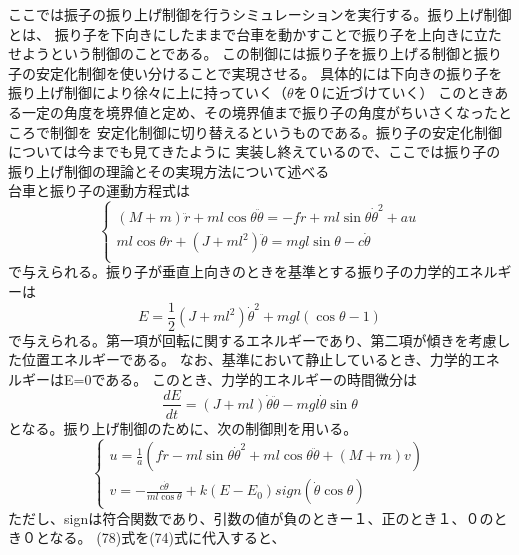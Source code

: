 \documentclass{jarticle}
\begin{document}
\begin{enumerate}
\begin{enumerate}
				ここでは振子の振り上げ制御を行うシミュレーションを実行する。振り上げ制御とは、
				振り子を下向きにしたままで台車を動かすことで振り子を上向きに立たせようという制御のことである。
				この制御には振り子を振り上げる制御と振り子の安定化制御を使い分けることで実現させる。
				具体的には下向きの振り子を振り上げ制御により徐々に上に持っていく（$\theta$を０に近づけていく）
				このときある一定の角度を境界値と定め、その境界値まで振り子の角度がちいさくなったところで制御を
				安定化制御に切り替えるというものである。振り子の安定化制御については今までも見てきたように
				実装し終えているので、ここでは振り子の振り上げ制御の理論とその実現方法について述べる\\
				台車と振り子の運動方程式は
				\begin{equation}
					\left\{
					\begin{array}{l}
						(M+m)\ddot{r}+ml\cos{\theta}\ddot{\theta} = -f\dot{r} + ml\sin{\theta}\dot{\theta}^{2}+au\\
						ml\cos{\theta}\ddot{r}+(J+ml^{2})\ddot{\theta} = mgl\sin{\theta}-c\dot{\theta}\\
					\end{array}
					\right.
				\end{equation}
				で与えられる。振り子が垂直上向きのときを基準とする振り子の力学的エネルギーは
				\begin{equation}
					E = \frac{1}{2}(J+ml^{2})\dot{\theta}^{2}+mgl(\cos{\theta}-1)
				\end{equation}
				で与えられる。第一項が回転に関するエネルギーであり、第二項が傾きを考慮した位置エネルギーである。
				なお、基準において静止しているとき、力学的エネルギーはE=0である。
				このとき、力学的エネルギーの時間微分は
				\begin{equation}
					\frac{dE}{dt} = (J+ml)\dot{\theta}\ddot{\theta}-mgl\dot{\theta}\sin{\theta}
				\end{equation}
				となる。振り上げ制御のために、次の制御則を用いる。
				\begin{equation}
					\left\{
					\begin{array}{l}
						u = \frac{1}{a}\left(f\dot{r} - ml\sin{\theta}\dot{\theta}^{2} + ml\cos{\theta}\ddot{\theta} + (M+m)v \right)\\
						v = -\frac{c\dot{\theta}}{ml\cos{\theta}}+k(E-E_{0})sign(\dot{\theta}\cos{\theta})
					\end{array}
					\right.
				\end{equation}
				ただし、signは符合関数であり、引数の値が負のときー１、正のとき１、０のとき０となる。
				(78)式を(74)式に代入すると、

\end{enumerate}
\end{enumerate}
\end{document}
